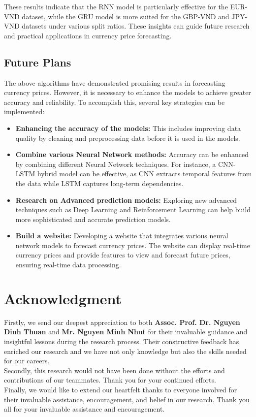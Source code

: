 \documentclass{ieeeojies}
\begin{document}
These results indicate that the RNN model is particularly effective for the EUR-VND dataset, while the GRU model is more suited for the GBP-VND and JPY-VND datasets under various split ratios. These insights can guide future research and practical applications in currency price forecasting.
 
\subsection{Future Plans}
The above algorithms have demonstrated promising results in forecasting currency prices. However, it is necessary to enhance the models to achieve greater accuracy and reliability. To accomplish this, several key strategies can be implemented:
\begin{itemize}
    \item \textbf{Enhancing the accuracy of the models:} This includes improving data quality by cleaning and preprocessing data before it is used in the models.
    \item \textbf{Combine various Neural Network methods:} Accuracy can be enhanced by combining different Neural Network techniques. For instance, a CNN-LSTM hybrid model can be effective, as CNN extracts temporal features from the data while LSTM captures long-term dependencies.
    \item \textbf{Research on Advanced prediction models:} Exploring new advanced techniques such as Deep Learning and Reinforcement Learning can help build more sophisticated and accurate prediction models.
    \item \textbf{Build a website:} Developing a website that integrates various neural network models to forecast currency prices. The website can display real-time currency prices and provide features to view and forecast future prices, ensuring real-time data processing.
\end{itemize}

\section*{Acknowledgment}
Firstly, we send our deepest appreciation to both \textbf{Assoc. Prof. Dr. Nguyen Dinh Thuan} and \textbf{Mr. Nguyen Minh Nhut} for their invaluable guidance and insightful lessons during the research process. Their constructive feedback has enriched our research and we have not only knowledge but also the skills needed for our careers. 
\\Secondly, this research would not have been done without the efforts and contributions of our teammates. Thank you for your continued efforts. 
\\Finally, we would like to extend our heartfelt thanks to everyone involved for their invaluable assistance, encouragement, and belief in our research. Thank you all for your invaluable assistance and encouragement.

\EOD
\printbibliography
\end{document}
